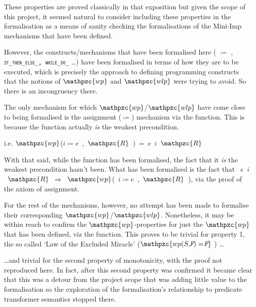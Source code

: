 \documentclass[oneside,12pt]{article}
\newcommand{\agdamath}[1]{\emph{\texttt{\!#1}}}
\newcommand{\impcode}[1]{\textsc{\texttt{#1}}}
\newcommand{\textM}[1]{\ensuremath{\mathpzc{#1}}}
\begin{document}
These properties are proved classically in that exposition but given the scope of this project, it seemed natural to consider including these properties in the formalisation as a means of sanity checking the formalisations of the Mini-Imp mechanisms that have been defined.

However, the constructs/mechanisms that have been formalised here ( $\coloneqq$ ,  \impcode{if\_then\_else\_, while\_do\_} \ldots ) have been formalised in terms of how they are to be executed, which is precisely the approach to defining programming constructs that the notions of \textM{wp}  and \textM{wlp} were trying to avoid. So there is an incongruency there.

  The only mechanism for which \textM{wp}/\textM{wlp} have come close to being formalised is the assignment ($\coloneqq$) mechanism via the  function. This is because the  function actually \emph{is} the weakest precondition.

\begin{center}
  
  i.e.\!\! \mbox{\textM{wp}($ i \coloneqq e$ , \textM{R} ) =  $e$ $i$ \textM{R}}

\end{center}


With that said, while the  function has been formalised, the fact that it \emph{is} the weakest precondition hasn't been. What has been formalised is the fact that \mbox{ $e$ $i$ \textM{R} $\Rightarrow$ \textM{wp}( $ i \coloneqq e$ , \textM{R} )}, via the proof of the axiom of assignment.

For the rest of the mechanisms, however, no attempt has been made to formalise their corresponding \textM{wp}/\textM{wlp}. Nonetheless, it may be within reach to confirm the \textM{wp}-properties for just the \textM{wp} that has been defined, viz the  function. This proves to be trivial for property 1, the so called `Law of the Excluded Miracle' (\textM{wp(S, \agdamath{F}) = \agdamath{F}} )  \ldots

{\centering }

\ldots and trivial for the second property of monotonicity, with the proof not reproduced here. In fact, after this second property was confirmed it became clear that this was a detour from the project scope that was adding little value to the formalisation so the exploration of the formalisation's relationship to predicate transformer semantics stopped there.
\end{document}
